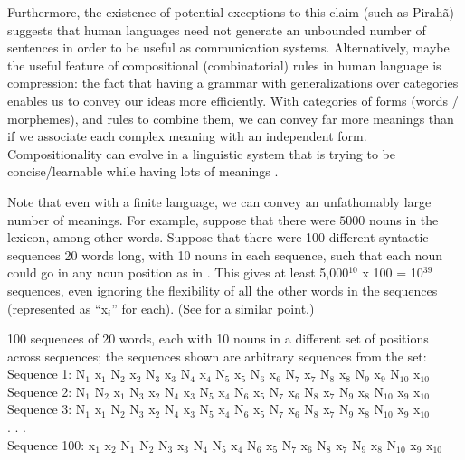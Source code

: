 \documentclass{article}
\begin{document}
Furthermore, the existence of potential exceptions to this claim (such as Pirahã) suggests that human languages need not generate an unbounded number of sentences in order to be useful as communication systems. Alternatively, maybe the useful feature of compositional (combinatorial) rules in human language is compression: the fact that having a grammar with generalizations over categories enables us to convey our ideas more efficiently. With categories of forms (words / morphemes), and rules to combine them, we can convey far more meanings than if we associate each complex meaning with an independent form. Compositionality can evolve in a linguistic system that is trying to be concise/learnable while having lots of meanings \citep{kirby2000syntax}.


Note that even with a finite language, we can convey an unfathomably large number of meanings. For example, suppose that there were $5000$ nouns in the lexicon, among other words. Suppose that there were 100 different syntactic sequences 20 words long, with 10 nouns in each sequence, such that each noun could go in any noun position as in . This gives at least 5,000$^{10}$ x 100 = 10$^{39}$ sequences, even ignoring the flexibility of all the other words in the sequences (represented as ``x$_i$'' for each). (See \citet{muller2016grammatical} for a similar point.)

\ea
\label{ex1}
100 sequences of 20 words, each with 10 nouns in a different set of positions across sequences; the sequences shown are arbitrary sequences from the set:\\
Sequence 1: N$_1$ x$_1$ N$_2$ x$_2$ N$_3$ x$_3$ N$_4$ x$_4$ N$_5$ x$_5$ N$_6$ x$_6$ N$_7$ x$_7$ N$_8$ x$_8$ N$_9$ x$_9$ N$_{10}$ x$_{10}$\\
Sequence 2: N$_1$ N$_2$ x$_1$ N$_3$ x$_2$ N$_4$ x$_3$ N$_5$ x$_4$ N$_6$ x$_5$ N$_7$ x$_6$ N$_8$ x$_7$ N$_9$ x$_8$ N$_{10}$ x$_9$ x$_{10}$\\
Sequence 3: N$_1$ x$_1$ N$_2$ N$_3$ x$_2$ N$_4$ x$_3$ N$_5$ x$_4$ N$_6$ x$_5$ N$_7$ x$_6$ N$_8$ x$_7$ N$_9$ x$_8$ N$_{10}$ x$_9$ x$_{10}$\\
. . .\\
Sequence 100: x$_1$ x$_2$ N$_1$ N$_2$ N$_3$ x$_3$ N$_4$ N$_5$ x$_4$ N$_6$ x$_5$ N$_7$ x$_6$ N$_8$ x$_7$ N$_9$ x$_8$ N$_{10}$ x$_9$ x$_{10}$
\z
\end{document}
